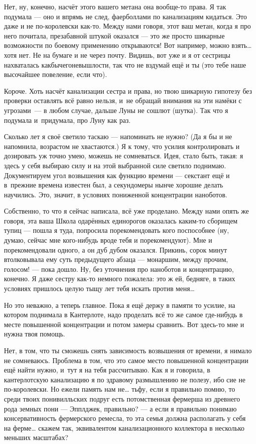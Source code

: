 \documentclass[fontsize=11pt,a5paper,titlepage=firstcover]{scrbook}
\begin{document}
Нет, ну, конечно, насчёт этого вашего метана она вообще-то права. Я так подумала --- оно и впрямь не след, фаерболлами по канализациям кидаться. Это даже и не по-королевски как-то. Между нами говоря, этот ваш метан, когда я про него почитала, презабавной штукой оказался --- это же просто шикарные возможности по боевому применению открываются! Вот например, можно взять{\ldots} хотя нет. Не на бумаге и не через почту. Видишь, вот уже и я от сестрицы нахваталась какбычегоневышлости, так что не вздумай ещё и ты (это тебе наше высочайшее повеление, если что).

Короче. Хоть насчёт канализации сестра и права, но твою шикарную гипотезу без проверки оставлять всё равно нельзя, и~не обращай внимания на эти намёки с угрозами~--- в любом случае, дальше Луны не сошлют (шутка). Так что я подумала и~придумала, про Луну как раз.

Сколько лет я своё светило таскаю --- напоминать не нужно? (Да я бы и не напомнила, возрастом не хвастаются.) Я к тому, что усилия контролировать и дозировать уж точно умею, можешь не сомневаться. Идея, стало быть, такая: я здесь у себя выбираю силу и на этой выбранной силе светило поднимаю. Документируем угол возвышения как функцию времени --- секстант ещё и в~прежние времена известен был, а секундомеры нынче хорошие делать научились. Это, значит, в условиях пониженной концентрации наноботов.

Собственно, то что я сейчас написала, всё уже проделано. Между нами опять же говоря, эта ваша Школа одарённых единорогов оказалась каким-то сборищем тупиц --- пошла я туда, попросила порекомендовать кого поспособнее (ну, думаю, сейчас мне кого-нибудь вроде тебя и порекомендуют). Мне и порекомендовали одного, а он дуб дубом оказался. Прикинь, сорок минут втолковывала ему суть предыдущего абзаца --- монаршим, между прочим, голосом! --- пока дошло. Ну, без уточнения про наноботов и концентрацию, конечно. Я даже сестру как-то немного пожалела: это ж ей, бедняге, в таких условиях пришлось целую тыщу лет тебя искать против меня{\ldots}

Но это неважно, а теперь главное. Пока я ещё держу в памяти то усилие, на котором поднимала в Кантерлоте, надо проделать всё то же самое где-нибудь в месте повышенной концентрации и потом замеры сравнить. Вот здесь-то мне и нужна твоя помощь.

Нет, в том, что ты сможешь снять зависимость возвышения от времени, я нимало не сомневаюсь. Проблема в том, что это самое место повышенной концентрации ещё найти нужно, и~тут я на тебя рассчитываю. Как я и говорила, в кантерлотскую канализацию я по здравому размышлению не полезу, ибо сие не по-королевски. Но ежели память нам не{\ldots} тьфу, если я правильно помню, то среди твоих понивилльских подруг есть потомственная фермерша из древнего рода земных пони --- Эпплджек, правильно? --- а если я правильно понимаю консервативность фермерского ремесла, то эта семья должна располагать у себя на ферме{\ldots} скажем так, эквивалентом канализационного коллектора в несколько меньших масштабах?
\end{document}

